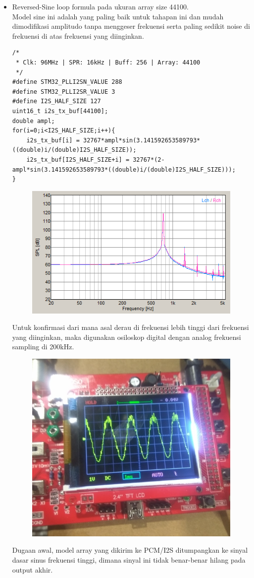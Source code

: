 \documentclass[12pt,]{article}
\begin{document}
\begin{itemize}
\begin{itemize}
			\newpage
			\item Reversed-Sine loop formula pada ukuran array size 44100.\\
			Model sine ini adalah yang paling baik untuk tahapan ini
			dan mudah dimodifikasi amplitudo tanpa menggeser frekuensi
			serta paling sedikit noise di frekuensi di atas frekuensi yang diinginkan. 
			\begin{verbatim}
/*
 * Clk: 96MHz | SPR: 16kHz | Buff: 256 | Array: 44100
 */
#define STM32_PLLI2SN_VALUE 288
#define STM32_PLLI2SR_VALUE 3
#define I2S_HALF_SIZE 127	
uint16_t i2s_tx_buf[44100];
double ampl;
for(i=0;i<I2S_HALF_SIZE;i++){
	i2s_tx_buf[i] = 32767*ampl*sin(3.141592653589793*((double)i/(double)I2S_HALF_SIZE));
	i2s_tx_buf[I2S_HALF_SIZE+i] = 32767*(2-ampl*sin(3.141592653589793*((double)i/(double)I2S_HALF_SIZE)));
}
			\end{verbatim}
			\begin{figure}[H]
				\centering
				\includegraphics[width=0.5\linewidth]{result/day_2/arr_spr_revsine}
			\end{figure}
		
			Untuk konfirmasi dari mana asal derau di frekuensi lebih tinggi dari frekuensi yang diinginkan,
			maka digunakan osiloskop digital dengan analog frekuensi sampling di 200kHz.
			\begin{figure}[H]
				\centering
				\includegraphics[width=0.5\linewidth]{result/day_2/osiloskop}
			\end{figure}
			
			Dugaan awal, model array yang dikirim ke PCM/I2S ditumpangkan ke sinyal dasar sinus frekuensi tinggi,
			dimana sinyal ini tidak benar-benar hilang pada output akhir.
		\end{itemize}
	\end{itemize}
\end{document}
